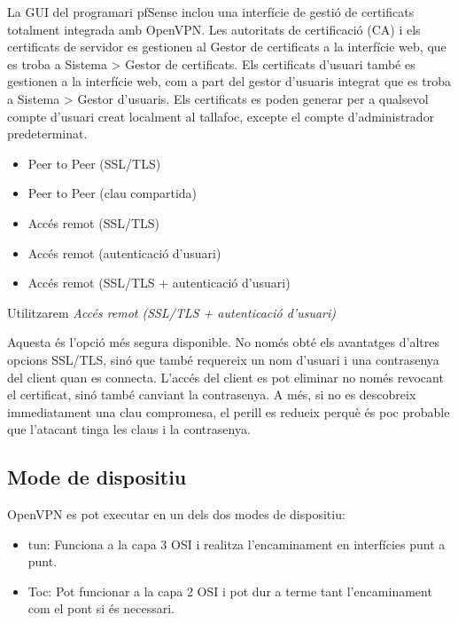 \documentclass[
  10pt,
]{krantz}
\providecommand{\tightlist}{%
  \setlength{\itemsep}{0pt}\setlength{\parskip}{0pt}}
\begin{document}
La GUI del programari pfSense inclou una interfície de gestió de certificats totalment integrada amb OpenVPN. Les autoritats de certificació (CA) i els certificats de servidor es gestionen al Gestor de certificats a la interfície web, que es troba a Sistema \textgreater{} Gestor de certificats. Els certificats d'usuari també es gestionen a la interfície web, com a part del gestor d'usuaris integrat que es troba a Sistema \textgreater{} Gestor d'usuaris. Els certificats es poden generar per a qualsevol compte d'usuari creat localment al tallafoc, excepte el compte d'administrador predeterminat.

\begin{itemize}
\tightlist
\item
  Peer to Peer (SSL/TLS)
\item
  Peer to Peer (clau compartida)
\item
  Accés remot (SSL/TLS)
\item
  Accés remot (autenticació d'usuari)
\item
  Accés remot (SSL/TLS + autenticació d'usuari)
\end{itemize}

Utilitzarem \emph{Accés remot (SSL/TLS + autenticació d'usuari)}

Aquesta és l'opció més segura disponible. No només obté els avantatges d'altres opcions SSL/TLS, sinó que també requereix un nom d'usuari i una contrasenya del client quan es connecta. L'accés del client es pot eliminar no només revocant el certificat, sinó també canviant la contrasenya. A més, si no es descobreix immediatament una clau compromesa, el perill es redueix perquè és poc probable que l'atacant tinga les claus i la contrasenya.

\hypertarget{mode-de-dispositiu}{%
\subsection{Mode de dispositiu}\label{mode-de-dispositiu}}

OpenVPN es pot executar en un dels dos modes de dispositiu:

\begin{itemize}
\item
  tun: Funciona a la capa 3 OSI i realitza l'encaminament en interfícies punt a punt.
\item
  Toc: Pot funcionar a la capa 2 OSI i pot dur a terme tant l'encaminament com el pont si és necessari.
\end{itemize}
\end{document}
